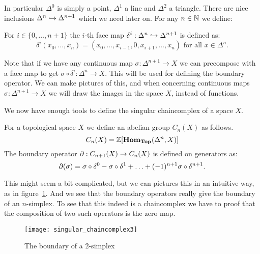 In particular $\Delta^0$ is simply a point, $\Delta^1$ a line and $\Delta^2$ a triangle. There are nice inclusions $\Delta^n \hookrightarrow \Delta^{n+1}$ which we need later on. For any $n \in \mathbb{N}$ we define:
\begin{definition}
	For $i \in \{0, \ldots, n+1\}$ the $i$-th face map $\delta^i : \Delta^n \hookrightarrow \Delta^{n+1}$ is defined as:
	$$ \delta^i (x_0, \ldots, x_n) = (x_0, \ldots, x_{i-1}, 0, x_{i+1}, \ldots, x_n) \text{ for all } x \in \Delta^n.$$
\end{definition}

Note that if we have any continuous map $\sigma : \Delta^{n+1} \to X$ we can precompose with a face map to get $\sigma \circ \delta^i : \Delta^n \to X$. This will be used for defining the boundary operator. We can make pictures of this, and when concerning continuous maps $\sigma : \Delta^{n+1} \to X$ we will draw the images in the space $X$, instead of functions.



We now have enough tools to define the singular chaincomplex of a space $X$.

\begin{definition}
	For a topological space $X$ we define an abelian group $C_n(X)$ as follows.
	$$ C_n(X) = \mathbb{Z}[\mathbf{Hom}_{\mathbf{Top}}(\Delta^n, X)] $$
	The boundary operator $\partial : C_{n+1}(X) \to C_n(X)$ is defined on generators as:
	$$ \partial(\sigma) = \sigma \circ \delta^0 - \sigma \circ \delta^1 + \ldots + (-1)^{n+1} \sigma \circ \delta^{n+1}.$$
\end{definition}

This might seem a bit complicated, but we can pictures this in an intuitive way, as in figure~\ref{fig:singular_chaincomplex3}. And we see that the boundary operators really give the boundary of an $n$-simplex. To see that this indeed is a chaincomplex we have to proof that the composition of two such operators is the zero map.
\begin{figure}
	\label{fig:singular_chaincomplex3}
	\texttt{[image: singular\_chaincomplex3]}
	\caption{The boundary of a 2-simplex}
\end{figure}

